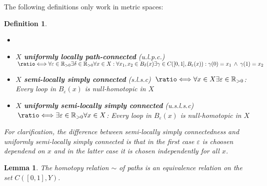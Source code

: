 \documentclass{article}
\newcommand{\R}[0]{\mathbb{R}}
\newcommand*{\longeq}{\ratio\Longleftrightarrow}
\theoremstyle{break}
\theoremstyle{break}
\newtheorem{defin}[thm]{Definition}
\newtheorem{lemma}[thm]{Lemma}
\begin{document}
The following definitions only work in metric spaces:

\begin{defin}
  \begin{itemize}
    \item[] %
    \item $X$ \textbf{uniformly locally path-connected} (u.l.p.c.) $\: \longeq \\ \forall \varepsilon \in \R_{>0} \exists \delta \in \R_{>0}\forall x \in X: \forall x_1, x_2 \in B_{\delta}(x)\exists \gamma \in C([0,1], B_{\varepsilon}(x)): \gamma(0) = x_1 \: \land \: \gamma(1) = x_2$
    \item $X$ \textbf{semi-locally simply connected} (s.l.s.c) $\: \longeq \\ \forall x\in X\exists \varepsilon \in \R_{>0}$: Every loop in $B_{\varepsilon}(x)$ is null-homotopic in $X$
    \item $X$ \textbf{uniformly semi-locally simply connected} (u.s.l.s.c) $\: \longeq \\ \exists \varepsilon \in \R_{>0}\forall x\in X$: Every loop in $B_{\varepsilon}(x)$ is null-homotopic in $X$
  \end{itemize}
  \vspace*{10pt}
  For clarification, the difference between semi-locally simply connectedness and uniformly semi-locally simply connected is 
  that in the first case $\varepsilon$ is choosen dependend on $x$ and in the latter case it is chosen independently for all $x$.
\end{defin}

\begin{lemma} \label{lem:homotopy-equivalence}
  The homotopy relation $\sim$ of paths is an equivalence relation on the set $C([0,1],Y)$.
\end{lemma}
\end{document}
